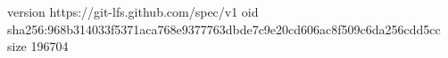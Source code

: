 version https://git-lfs.github.com/spec/v1
oid sha256:968b314033f5371aca768e9377763dbde7c9e20cd606ac8f509c6da256cdd5cc
size 196704
